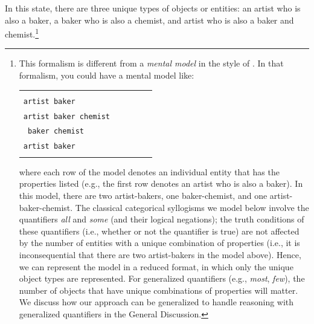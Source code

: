 \documentclass[floatsintext, doc]{apa6}
\begin{document}
\noindent In this state, there are three unique types of objects or entities: an artist who is also a baker, a baker who is also a chemist, and artist who is also a baker and chemist.\footnote{
This formalism is different from a \emph{mental model} in the style of  . In that formalism, you could have a mental model like:

\begin{tabularx}{.8\textwidth}{XXXXX}
& \\
\tt artist baker \\
\tt artist baker chemist \\
\tt \hspace{1cm} baker chemist \\
\tt artist baker \\
& \\
\end{tabularx}

\noindent where each row of the model denotes an individual entity that has the properties listed (e.g., the first row denotes an artist who is also a baker).
In this model, there are two artist-bakers, one baker-chemist, and one artist-baker-chemist.
The classical categorical syllogisms we model below involve the quantifiers \emph{all} and \emph{some} (and their logical negations); the truth conditions of these quantifiers (i.e., whether or not the quantifier is true) are not affected by the number of entities with a unique combination of properties (i.e., it is inconsequential that there are two artist-bakers in the model above).
Hence, we can represent the model in a reduced format, in which only the unique object types are represented.
For generalized quantifiers (e.g., \emph{most}, \emph{few}), the number of objects that have unique combinations of properties will matter. We discuss how our approach can be generalized to handle reasoning with generalized quantifiers in the General Discussion.
}

\end{document}
